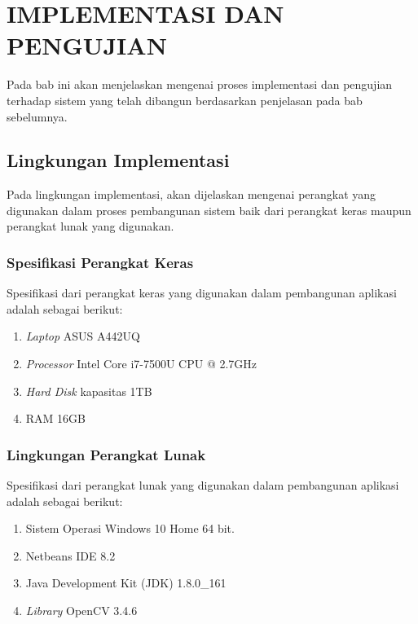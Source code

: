 \chapter{IMPLEMENTASI DAN PENGUJIAN}

%
\vspace{4.5pt}
\noindent Pada bab ini akan menjelaskan mengenai proses implementasi dan pengujian terhadap sistem yang telah dibangun berdasarkan penjelasan pada bab sebelumnya.\\

\section{Lingkungan Implementasi}
\noindent Pada lingkungan implementasi, akan dijelaskan mengenai perangkat yang digunakan dalam proses pembangunan sistem baik dari perangkat keras maupun perangkat lunak yang digunakan.\\

\subsection{Spesifikasi Perangkat Keras}
\noindent Spesifikasi dari perangkat keras yang digunakan dalam pembangunan aplikasi adalah sebagai berikut:
\begin{enumerate}
\item \textit{Laptop} ASUS A442UQ
\item \textit{Processor} Intel Core i7-7500U CPU @ 2.7GHz
\item \textit{Hard Disk} kapasitas 1TB
\item RAM 16GB\\
\end{enumerate}

\subsection{Lingkungan Perangkat Lunak}
\noindent Spesifikasi dari perangkat lunak yang digunakan dalam pembangunan aplikasi adalah sebagai berikut:
\begin{enumerate}
\item Sistem Operasi Windows 10 Home 64 bit.
\item Netbeans IDE 8.2
\item Java Development Kit (JDK) 1.8.0{\_}161
\item \textit{Library} OpenCV 3.4.6\\
\end{enumerate}

